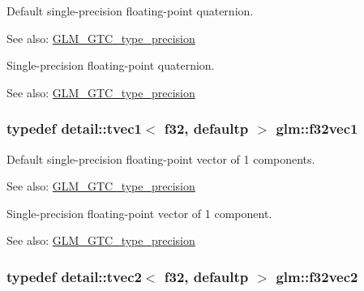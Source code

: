 Default single-precision floating-point quaternion. \begin{Desc}
\item[See also:]\hyperlink{group__gtc__type__precision}{GLM\_\-GTC\_\-type\_\-precision}\end{Desc}
Single-precision floating-point quaternion. \begin{Desc}
\item[See also:]\hyperlink{group__gtc__type__precision}{GLM\_\-GTC\_\-type\_\-precision} \end{Desc}
\hypertarget{group__gtc__type__precision_g7335bddf7a09ba275d5d04f7681f03e6}{
\subsubsection[f32vec1]{\setlength{\rightskip}{0pt plus 5cm}typedef detail::tvec1$<$ f32, defaultp $>$ {\bf glm::f32vec1}}}
\label{group__gtc__type__precision_g7335bddf7a09ba275d5d04f7681f03e6}


Default single-precision floating-point vector of 1 components. \begin{Desc}
\item[See also:]\hyperlink{group__gtc__type__precision}{GLM\_\-GTC\_\-type\_\-precision}\end{Desc}
Single-precision floating-point vector of 1 component. \begin{Desc}
\item[See also:]\hyperlink{group__gtc__type__precision}{GLM\_\-GTC\_\-type\_\-precision} \end{Desc}
\hypertarget{group__gtc__type__precision_g0eba48c6b8abbee31dbf5655dd171ead}{
\subsubsection[f32vec2]{\setlength{\rightskip}{0pt plus 5cm}typedef detail::tvec2$<$ f32, defaultp $>$ {\bf glm::f32vec2}}}
\label{group__gtc__type__precision_g0eba48c6b8abbee31dbf5655dd171ead}


